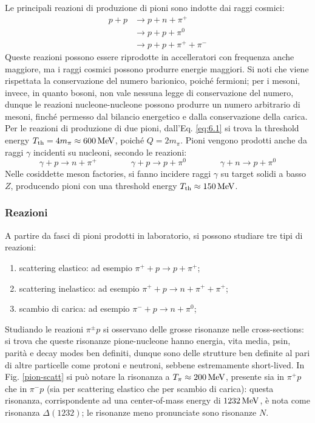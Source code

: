 Le principali reazioni di produzione di pioni sono indotte dai raggi cosmici:
\begin{equation*}
	\begin{split}
		p + p
		&\rightarrow p + n + \pi^+ \\
		&\rightarrow p + p + \pi^0 \\
		&\rightarrow p + p + \pi^+ + \pi^-
	\end{split}
\end{equation*}
Queste reazioni possono essere riprodotte in accelleratori con frequenza anche maggiore, ma i raggi cosmici possono produrre energie maggiori. Si noti che viene rispettata la conservazione del numero barionico, poiché fermioni; per i mesoni, invece, in quanto bosoni, non vale nessuna legge di conservazione del numero, dunque le reazioni nucleone-nucleone possono produrre un numero arbitrario di mesoni, finché permesso dal bilancio energetico e dalla conservazione della carica.\\
Per le reazioni di produzione di due pioni, dall'Eq. \ref{eq:6.1} si trova la threshold energy $ T_{\text{th}} = 4m_{\pi} \approx 600\,\mathrm{MeV} $, poiché $ Q = 2m_{\pi} $. Pioni vengono prodotti anche da raggi $ \gamma $ incidenti su nucleoni, secondo le reazioni:
\begin{equation*}
	\gamma + p \rightarrow n + \pi^+
	\qquad \qquad
	\gamma + p \rightarrow p + \pi^0
	\qquad \qquad
	\gamma + n \rightarrow p + \pi^0
\end{equation*}
Nelle cosiddette meson factories, si fanno incidere raggi $ \gamma $ su target solidi a basso $ Z $, producendo pioni con una threshold energy $ T_{\text{th}} \approx 150\,\mathrm{MeV} $.

\subsubsection{Reazioni}

A partire da fasci di pioni prodotti in laboratorio, si possono studiare tre tipi di reazioni:
\begin{enumerate}
	\item scattering elastico: ad esempio $ \pi^+ + p \rightarrow p + \pi^+ $;
	\item scattering inelastico: ad esempio $ \pi^+ + p \rightarrow n + \pi^+ + \pi^+ $;
	\item scambio di carica: ad esempio $ \pi^- + p \rightarrow n + \pi^0 $;
\end{enumerate}
Studiando le reazioni $ \pi^{\pm} p $ si osservano delle grosse risonanze nelle cross-sections: si trova che queste risonanze pione-nucleone hanno energia, vita media, psin, parità e decay modes ben definiti, dunque sono delle strutture ben definite al pari di altre particelle come protoni e neutroni, sebbene estremamente short-lived.
In Fig. \ref{pion-scatt} si può notare la risonanza a $ T_{\pi} \approx 200\,\mathrm{MeV} $, presente sia in $ \pi^+ p $ che in $ \pi^- p $ (sia per scattering elastico che per scambio di carica): questa risonanza, corrispondente ad una center-of-mass energy di $ 1232\,\mathrm{MeV} $, è nota come risonanza $ \Delta(1232) $; le risonanze meno pronunciate sono risonanze $ N $.

